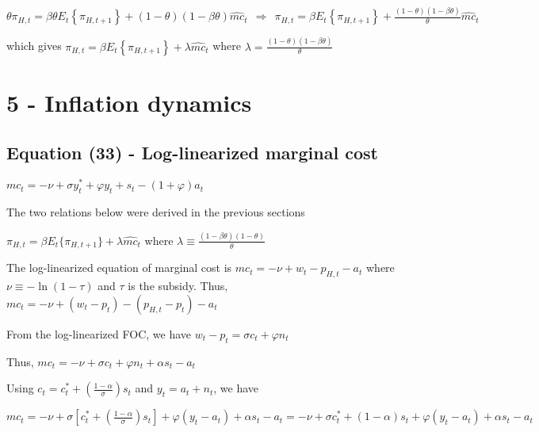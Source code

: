 \documentclass[
]{article}
\begin{document}
\(\displaystyle \theta \pi_{H,t} = \beta \theta E_t \left\{ \pi_{H,t+1}\right\} +(1-\theta) (1-\beta \theta)\widehat{mc}_t \ \ \Rightarrow \ \  \pi_{H,t} = \beta E_t \left\{ \pi_{H,t+1}\right\} +\frac{(1-\theta) (1-\beta \theta)}{\theta}\widehat{mc}_t\)

which gives
\(\pi_{H,t} = \beta E_t \left\{ \pi_{H,t+1}\right\}+ \lambda\widehat{mc}_t\)
where
\(\displaystyle \lambda = \frac{(1-\theta) (1-\beta \theta)}{\theta}\)

\vspace{12pt}

\hypertarget{inflation-dynamics}{%
\section{5 - Inflation dynamics}\label{inflation-dynamics}}

\vspace{12pt}

\hypertarget{equation-33---log-linearized-marginal-cost}{%
\subsection{Equation (33) - Log-linearized marginal
cost}\label{equation-33---log-linearized-marginal-cost}}

\(\displaystyle mc_t =-\nu + \sigma y_t^*+ \varphi y_t+ s_t -(1+\varphi)a_t\)

\vspace{8pt}

The two relations below were derived in the previous sections

\(\pi_{H,t} = \beta E_t \{ \pi_{H,t+1}\} + \lambda \widehat{mc}_t\)
where
\(\displaystyle \lambda \equiv \frac{(1-\beta \theta)(1-\theta)}{\theta}\)

The log-linearized equation of marginal cost is
\(mc_t = -\nu+w_t-p_{H,t}-a_t\) where \(\nu\equiv -\ln(1-\tau)\) and
\(\tau\) is the subsidy. Thus,
\(mc_t= -\nu + (w_t-p_t) - (p_{H,t}-p_t)-a_t\)

From the log-linearized FOC, we have
\(w_t-p_t=\sigma c_t + \varphi n_t\)

Thus, \(mc_t= -\nu + \sigma c_t + \varphi n_t + \alpha s_t -a_t\)

Using
\(\displaystyle c_t=c_t^*+ \left( \frac{1-\alpha}{\sigma} \right)s_t\)
and \(y_t = a_t + n_t\), we have

\(\displaystyle mc_t= -\nu + \sigma \left[ c_t^*+ \left( \frac{1-\alpha}{\sigma} \right)s_t \right] + \varphi (y_t-a_t) + \alpha s_t -a_t=-\nu + \sigma c_t^*+ ( 1-\alpha )s_t + \varphi (y_t-a_t) + \alpha s_t -a_t\)
\end{document}
